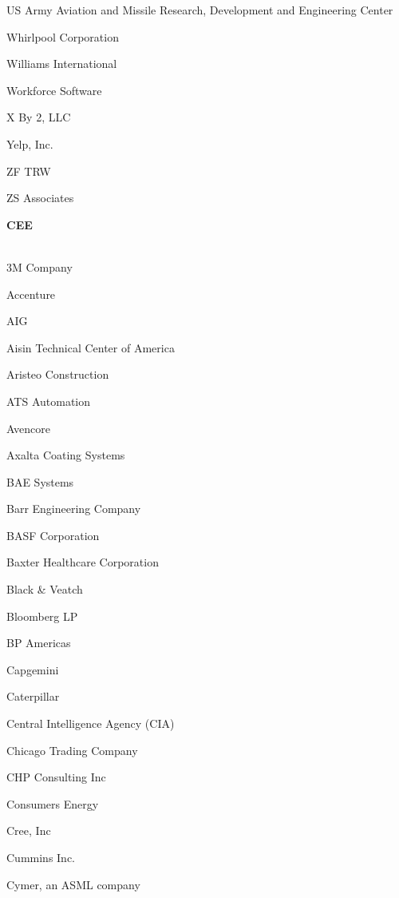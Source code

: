 \documentclass[twoside]{article}
\begin{document}
\begin{center}
\begin{multicols}{5}
\begin{FlushLeft}
\begin{compactitem}
\item US Army Aviation and Missile Research, Development and Engineering Center
\item Whirlpool Corporation
\item Williams International
\item Workforce Software
\item X By 2, LLC
\item Yelp, Inc.
\item ZF TRW
\item ZS Associates
\end{compactitem}
        \end{FlushLeft}
        \vspace{1em}
        {\fontsize{14}{16}\selectfont \bf CEE}\\
        \vspace{-1em}
        ~\hrulefill~
        \vspace{-.9em}
        \begin{FlushLeft}
        \begin{compactitem}
        \item 3M Company
\item Accenture
\item AIG
\item Aisin Technical Center of America
\item Aristeo Construction
\item ATS Automation
\item Avencore
\item Axalta Coating Systems
\item BAE Systems
\item Barr Engineering Company
\item BASF Corporation
\item Baxter Healthcare Corporation
\item Black \& Veatch
\item Bloomberg LP
\item BP Americas
\item Capgemini
\item Caterpillar
\item Central Intelligence Agency (CIA)
\item Chicago Trading Company
\item CHP Consulting Inc
\item Consumers Energy
\item Cree, Inc
\item Cummins Inc.
\item Cymer, an ASML company

\end{compactitem}
\end{FlushLeft}
\end{multicols}
\end{center}
\end{document}
